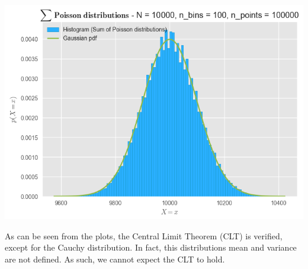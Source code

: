 \documentclass[
]{article}
\begin{document}
\includegraphics{vertopal_6d63c4420d4a47a4b64ec714b34abd06/7e3e3c7f87cd19bb9cc16a1598cf3329ece30ce8.png}

As can be seen from the plots, the Central Limit Theorem (CLT) is
verified, except for the Cauchy distribution. In fact, this
distribution\textquotesingle s mean and variance are not defined. As
such, we cannot expect the CLT to hold.
\end{document}

